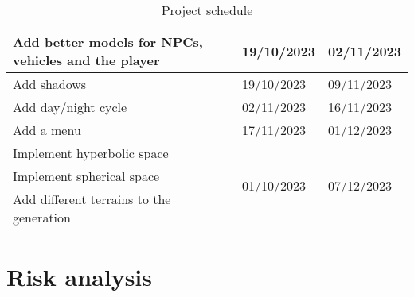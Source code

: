 \documentclass[12pt]{article}
\begin{document}
\begin{table}[H]
\begin{tabular}{lll}
		Add better models for NPCs, vehicles and the player & 19/10/2023                   & 02/11/2023                   \\ \hline
		Add shadows                                         & 19/10/2023                   & 09/11/2023                   \\ \hline
		Add day/night cycle                                 & 02/11/2023                   & 16/11/2023                   \\ \hline
		Add a menu                                          & 17/11/2023                   & 01/12/2023                   \\ \hline
		Implement hyperbolic space                          & \multirow{3}{*}{01/10/2023}  & \multirow{3}{*}{07/12/2023}  \\
		Implement spherical space                           &                              &                              \\
		Add different terrains to the generation            &                              &                              \\ \hline
	\end{tabular}
	\caption{Project schedule}
\end{table}

\section{Risk analysis} %
\end{document}

